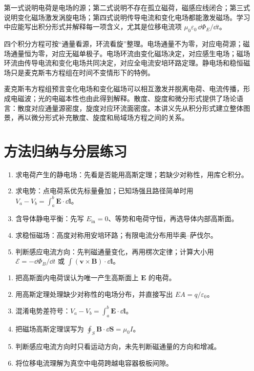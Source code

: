 \begin{attention}[四个方程的物理意义]
第一式说明电荷是电场的源；第二式说明不存在孤立磁荷，磁感应线闭合；第三式说明变化磁场激发涡旋电场；第四式说明传导电流和变化电场都能激发磁场。学习中应能写出积分形式并解释每一项含义，尤其是位移电流项 $\mu_0\varepsilon_0\,\dd\Phi_E/\dd t$。
\end{attention}

\begin{method}[麦克斯韦方程组的记忆结构]
四个积分方程可按“通量看源，环流看旋”整理。电场通量不为零，对应电荷源；磁场通量恒为零，对应无磁单极子。电场环流由变化磁场决定，对应感生电场；磁场环流由传导电流和变化电场共同决定，对应全电流安培环路定理。静电场和稳恒磁场只是麦克斯韦方程组在时间不变情形下的特例。
\end{method}

\begin{attention}[麦克斯韦方程组的进一步意义]
麦克斯韦方程组预言变化电场和变化磁场可以相互激发并脱离电荷、电流传播，形成电磁波；光的电磁本性也由此得到解释。散度、旋度和微分形式提供了场论语言：散度对应通量源密度，旋度对应环流面密度。本讲义先从积分形式建立整体图景，再以微分形式补充散度、旋度和局域场方程之间的关系。
\end{attention}

\section{方法归纳与分层练习}

\begin{method}[电磁学题目的入口判断]
\begin{enumerate}
  \item 求电荷产生的静电场：先看是否能用高斯定理；若缺少对称性，用库仑积分。
  \item 求电势：点电荷系优先标量叠加；已知场强且路径简单时用 $V_a-V_b=\int_a^b\bm E\cdot\dd\bm l$。
  \item 含导体静电平衡：先写 $E_{\mathrm{in}}=0$、等势和电荷守恒，再选导体内部高斯面。
  \item 求稳恒磁场：高度对称用安培环路；有限电流分布用毕奥--萨伐尔。
  \item 判断感应电流方向：先判磁通量变化，再用楞次定律；计算大小用 $\mathcal E=-\dd\Phi_B/\dd t$ 或 $\int(\bm v\times\bm B)\cdot\dd\bm l$。
\end{enumerate}
\end{method}

\begin{pitfall}[常见错误]
\begin{enumerate}
  \item 把高斯面内电荷误认为唯一产生高斯面上 $\bm E$ 的电荷。
  \item 用高斯定理处理缺少对称性的电场分布，并直接写出 $EA=q/\varepsilon_0$。
  \item 混淆电势差符号：$V_a-V_b=\int_a^b\bm E\cdot\dd\bm l$。
  \item 把磁场高斯定理误写为 $\oint_S\bm B\cdot\dd\bm S=\mu_0 I$。
  \item 判断感应电流方向时只看运动方向，未先判断磁通量的方向和增减。
  \item 将位移电流理解为真空中电荷跨越电容器极板间隙。
\end{enumerate}
\end{pitfall}
